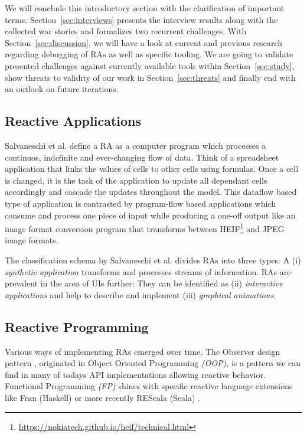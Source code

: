 \documentclass[12pt,a4paper]{article}
\begin{document}
We will conclude this introductory section with the clarification of important terms. Section~\ref{sec:interviews} presents the interview results along with the collected war stories and formalizes two recurrent challenges. With Section~\ref{sec:discussion}, we will have a look at current and previous research regarding debugging of RAs as well as specific tooling. We are going to validate presented challenges against currently available tools within Section~\ref{sec:study}, show threats to validity of our work in Section~\ref{sec:threats} and finally end with an outlook on future iterations.

\subsection{Reactive Applications}

Salvaneschi et al. \cite{7827078} define a RA as a computer program which processes a continuos, indefinite and ever-changing flow of data. Think of a spreadsheet application\cite{10.1145/2501654.2501666} that links the values of cells to other cells using formulas. Once a cell is changed, it is the task of the application to update all dependant cells accordingly and cascade the updates throughout the model. This dataflow based type of application is contrasted by program-flow based applications which consume and process one piece of input while producing a one-off output like an image format conversion program that transforms between HEIF\footnote{\url{https://nokiatech.github.io/heif/technical.html}} and JPEG image formats.

The classification schema by Salvaneschi et al. \cite{7827078} divides RAs into three types: A (i) \emph{synthetic application} transforms and processes streams of information. RAs are prevalent in the area of UIs further: They can be identified as (ii) \emph{interactive applications} and help to describe and implement (iii) \emph{graphical animations}.

\subsection{Reactive Programming}

Various ways of implementing RAs emerged over time. The Observer design pattern \cite{gamma1995design}, originated in Object Oriented Programming \emph{(OOP)}, is a pattern we can find in many of todays API implementations\cite{alabor:2019:reactiveappllications} allowing reactive behavior. Functional Programming \emph{(FP)} shines with specific reactive language extensions like Fran (Haskell) \cite{10.1145/2501654.2501666} or more recently REScala (Scala) \cite{10.1145/2577080.2577083}.
\end{document}
